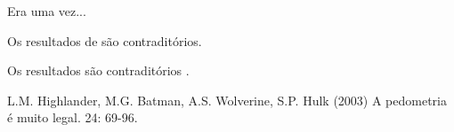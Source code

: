 Era uma vez...



Os resultados de \cite{highlander:2003} são contraditórios.



Os resultados são contraditórios \citep{highlander:2003}.



\begin{footnotesize}
\begin{thebibliography}{99}



L.M. Highlander, M.G. Batman, A.S. Wolverine, S.P. Hulk (2003)
\newblock A pedometria é muito legal.
 24: 69-96.





\end{thebibliography}
\end{footnotesize}



